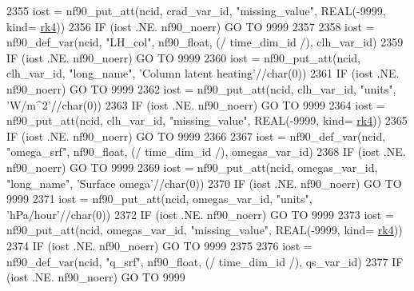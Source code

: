 \begin{DoxyCode}
{{{{{{2355     iost    = nf90\_put\_att(ncid, crad\_var\_id, \textcolor{stringliteral}{"missing\_value"}, \textcolor{keywordtype}{REAL}(-9999, kind=
      \hyperlink{namespaceportable_abaed22a509442771d3fba69bebda0b33}{rk4}))
2356     \textcolor{keywordflow}{IF} (iost .NE. nf90\_noerr) \textcolor{keywordflow}{GO TO} 9999
2357 
2358     iost    = nf90\_def\_var(ncid, \textcolor{stringliteral}{"LH\_col"}, nf90\_float, (/ time\_dim\_id /), clh\_var\_id)
2359     \textcolor{keywordflow}{IF} (iost .NE. nf90\_noerr) \textcolor{keywordflow}{GO TO} 9999
2360     iost    = nf90\_put\_att(ncid, clh\_var\_id, \textcolor{stringliteral}{"long\_name"}, \textcolor{stringliteral}{'Column latent heating'}//char(0))
2361     \textcolor{keywordflow}{IF} (iost .NE. nf90\_noerr) \textcolor{keywordflow}{GO TO} 9999
2362     iost    = nf90\_put\_att(ncid, clh\_var\_id, \textcolor{stringliteral}{"units"}, \textcolor{stringliteral}{'W/m^2'}//char(0))
2363     \textcolor{keywordflow}{IF} (iost .NE. nf90\_noerr) \textcolor{keywordflow}{GO TO} 9999
2364     iost    = nf90\_put\_att(ncid, clh\_var\_id, \textcolor{stringliteral}{"missing\_value"}, \textcolor{keywordtype}{REAL}(-9999, kind=
      \hyperlink{namespaceportable_abaed22a509442771d3fba69bebda0b33}{rk4}))
2365     \textcolor{keywordflow}{IF} (iost .NE. nf90\_noerr) \textcolor{keywordflow}{GO TO} 9999
2366 
2367     iost    = nf90\_def\_var(ncid, \textcolor{stringliteral}{"omega\_srf"}, nf90\_float, (/ time\_dim\_id /), omegas\_var\_id)
2368     \textcolor{keywordflow}{IF} (iost .NE. nf90\_noerr) \textcolor{keywordflow}{GO TO} 9999
2369     iost    = nf90\_put\_att(ncid, omegas\_var\_id, \textcolor{stringliteral}{"long\_name"}, \textcolor{stringliteral}{'Surface omega'}//char(0))
2370     \textcolor{keywordflow}{IF} (iost .NE. nf90\_noerr) \textcolor{keywordflow}{GO TO} 9999
2371     iost    = nf90\_put\_att(ncid, omegas\_var\_id, \textcolor{stringliteral}{"units"}, \textcolor{stringliteral}{'hPa/hour'}//char(0))
2372     \textcolor{keywordflow}{IF} (iost .NE. nf90\_noerr) \textcolor{keywordflow}{GO TO} 9999
2373     iost    = nf90\_put\_att(ncid, omegas\_var\_id, \textcolor{stringliteral}{"missing\_value"}, \textcolor{keywordtype}{REAL}(-9999, kind=
      \hyperlink{namespaceportable_abaed22a509442771d3fba69bebda0b33}{rk4}))
2374     \textcolor{keywordflow}{IF} (iost .NE. nf90\_noerr) \textcolor{keywordflow}{GO TO} 9999
2375 
2376     iost    = nf90\_def\_var(ncid, \textcolor{stringliteral}{"q\_srf"}, nf90\_float, (/ time\_dim\_id /), qs\_var\_id)
2377     \textcolor{keywordflow}{IF} (iost .NE. nf90\_noerr) \textcolor{keywordflow}{GO TO} 9999
}}}}}}
\end{DoxyCode}
